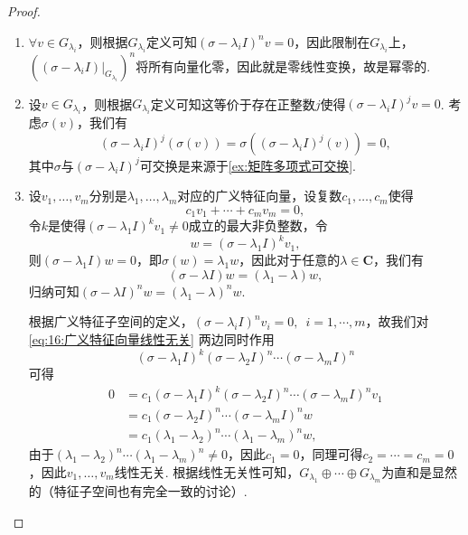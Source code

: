 \begin{proof}
    \begin{enumerate}
        \item $\forall v\in G_{\lambda_i}$，则根据$G_{\lambda_i}$定义可知$(\sigma-\lambda_i I)^nv=0$，因此限制在$G_{\lambda_i}$上，$((\sigma-\lambda_i I)\vert_{G_{\lambda_i}})^n$将所有向量化零，因此就是零线性变换，故是幂零的.

        \item 设$v\in G_{\lambda_i}$，则根据$G_{\lambda_i}$定义可知这等价于存在正整数$j$使得$(\sigma-\lambda_i I)^jv=0$. 考虑$\sigma(v)$，我们有
              \[(\sigma-\lambda_i I)^j(\sigma(v))=\sigma((\sigma-\lambda_i I)^j(v))=0,\]
              其中$\sigma$与$(\sigma-\lambda_i I)^j$可交换是来源于\autoref{ex:矩阵多项式可交换}.

        \item 设$v_1,\ldots,v_m$分别是$\lambda_1,\ldots,\lambda_m$对应的广义特征向量，设复数$c_1,\ldots,c_m$使得
              \begin{equation} \label{eq:16:广义特征向量线性无关}
                  c_1v_1+\cdots+c_mv_m=0,
              \end{equation}
              令$k$是使得$(\sigma-\lambda_1 I)^kv_1\neq 0$成立的最大非负整数，令
              \[w=(\sigma-\lambda_1 I)^{k}v_1,\]
              则$(\sigma-\lambda_1 I)w=0$，即$\sigma(w)=\lambda_1w$，因此对于任意的$\lambda\in\mathbf{C}$，我们有
              \[(\sigma-\lambda I)w=(\lambda_1-\lambda)w,\]
              归纳可知$(\sigma-\lambda I)^nw=(\lambda_1-\lambda)^nw$.

              根据广义特征子空间的定义，$(\sigma-\lambda_i I)^nv_i=0,\enspace i=1,\cdots,m$，故我们对\autoref{eq:16:广义特征向量线性无关} 两边同时作用
              \[(\sigma-\lambda_1 I)^k(\sigma-\lambda_2 I)^n\cdots(\sigma-\lambda_m I)^n\]
              可得
              \begin{align*}
                  0 & = c_1(\sigma-\lambda_1 I)^k(\sigma-\lambda_2 I)^n\cdots(\sigma-\lambda_m I)^nv_1 \\
                    & = c_1(\sigma-\lambda_2 I)^n\cdots(\sigma-\lambda_m I)^nw                         \\
                    & = c_1(\lambda_1-\lambda_2)^n\cdots(\lambda_1-\lambda_m)^nw,
              \end{align*}
              由于$(\lambda_1-\lambda_2)^n\cdots(\lambda_1-\lambda_m)^n\neq 0$，因此$c_1=0$，同理可得$c_2=\cdots=c_m=0$，因此$v_1,\ldots,v_m$线性无关. 根据线性无关性可知，$G_{\lambda_1}\oplus\cdots\oplus G_{\lambda_m}$为直和是显然的（特征子空间也有完全一致的讨论）.


\end{enumerate}
\end{proof}
